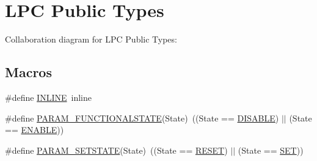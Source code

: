 \hypertarget{group__LPC__Types__Public__Types}{}\section{L\+PC Public Types}
\label{group__LPC__Types__Public__Types}
Collaboration diagram for L\+PC Public Types\+:
\subsection*{Macros}
\begin{DoxyCompactItemize}
\item 
\#define \hyperlink{group__LPC__Types__Public__Types_ga2eb6f9e0395b47b8d5e3eeae4fe0c116}{I\+N\+L\+I\+NE}~inline
\item 
\#define \hyperlink{group__LPC__Types__Public__Types_ga5475435ea985fe5abbf2048e87e3e682}{P\+A\+R\+A\+M\+\_\+\+F\+U\+N\+C\+T\+I\+O\+N\+A\+L\+S\+T\+A\+TE}(State)~((State == \hyperlink{group__LPC__Types__Public__Types_ggac9a7e9a35d2513ec15c3b537aaa4fba1ad3a9df141be0ccf10389b640f492b26d}{D\+I\+S\+A\+B\+LE}) $\vert$$\vert$ (State == \hyperlink{group__LPC__Types__Public__Types_ggac9a7e9a35d2513ec15c3b537aaa4fba1a7d46875fa3ebd2c34d2756950eda83bf}{E\+N\+A\+B\+LE}))
\item 
\#define \hyperlink{group__LPC__Types__Public__Types_gafb6827323e4c501477936a84bd733b4f}{P\+A\+R\+A\+M\+\_\+\+S\+E\+T\+S\+T\+A\+TE}(State)~((State == \hyperlink{group__LPC__Types__Public__Types_gga89136caac2e14c55151f527ac02daaffa589b7d94a3d91d145720e2fed0eb3a05}{R\+E\+S\+ET}) $\vert$$\vert$ (State == \hyperlink{group__LPC__Types__Public__Types_gga89136caac2e14c55151f527ac02daaffab44c8101cc294c074709ec1b14211792}{S\+ET}))
\end{DoxyCompactItemize}
